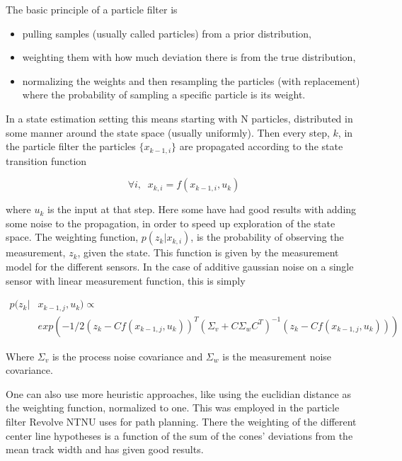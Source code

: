 The basic principle of a particle filter is 

\begin{itemize}
    \item pulling samples (usually called particles) from a prior distribution, 
    \item weighting them with how much deviation there is from the true distribution, 
    \item normalizing the weights and then resampling the particles (with replacement) where the probability of sampling a specific particle is its weight. 
\end{itemize}

In a state estimation setting this means starting with N particles, distributed in some manner around the state space (usually uniformly). Then every step, $k$, in the particle filter the particles $\{x_{k-1,i}\}$ are propagated according to the state transition function

\begin{equation}
\forall i, \; \; x_{k,i} = f(x_{k-1,i}, u_k)
\end{equation}

where $u_k$ is the input at that step. Here some have had good results with adding some noise to the propagation, in order to speed up exploration of the state space\cite{ParticleNoise}. The weighting function, $p(z_k|x_{k,i})$, is the probability of observing the measurement, $z_k$, given the state. This function is given by the measurement model for the different sensors. In the case of additive gaussian noise on a single sensor with linear measurement function, this is simply

\begin{align}
    p(z_k| & x_{k-1, j}, u_k) \propto \\
    & exp(-1/2(z_k - Cf(x_{k-1, j}, u_k))^T
    (\Sigma_v + C\Sigma_wC^T)^{-1}(z_k - Cf(x_{k-1, j}, u_k))) \nonumber
\end{align}

Where $\Sigma_v$ is the process noise covariance and $\Sigma_w$ is the measurement noise covariance.  

One can also use more heuristic approaches, like using the euclidian distance as the weighting function, normalized to one. This was employed in the particle filter Revolve NTNU uses for path planning. There the weighting of the different center line hypotheses is a function of the sum of the cones' deviations from the mean track width and has given good results.

